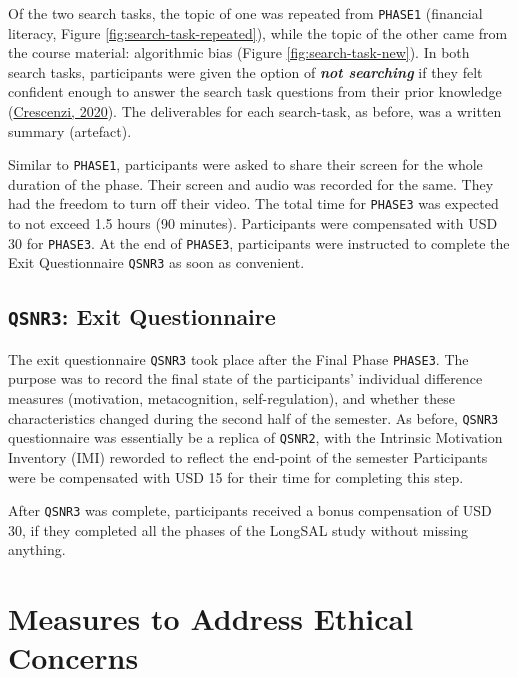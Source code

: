 \documentclass[letterpaper, nobind]{templates/ociamthesis}
\begin{document}
Of the two search tasks, the topic of one was repeated from \texttt{PHASE1} (financial literacy, Figure \ref{fig:search-task-repeated}), while the topic of the other came from the course material: algorithmic bias (Figure \ref{fig:search-task-new}).
In both search tasks, participants were given the option of \textbf{\emph{not searching}} if they felt confident enough to answer the search task questions from their prior knowledge (\protect\hyperlink{ref-crescenzi2020adaptation}{Crescenzi, 2020}).
The deliverables for each search-task, as before, was a written summary (artefact).

Similar to \texttt{PHASE1}, participants were asked to share their screen for the whole duration of the phase.
Their screen and audio was recorded for the same. They had the freedom to turn off their video. The total time for \texttt{PHASE3} was expected to not exceed 1.5 hours (90 minutes).
Participants were compensated with USD 30 for \texttt{PHASE3}.
At the end of \texttt{PHASE3}, participants were instructed to complete the Exit Questionnaire \texttt{QSNR3} as soon as convenient.

\hypertarget{sec-method-qsnr3}{%
\subsection{\texorpdfstring{\texttt{QSNR3}: Exit Questionnaire}{QSNR3: Exit Questionnaire}}\label{sec-method-qsnr3}}

The exit questionnaire \texttt{QSNR3} took place after the Final Phase \texttt{PHASE3}.
The purpose was to record the final state of the participants' individual difference measures (motivation, metacognition, self-regulation), and whether these characteristics changed during the second half of the semester.
As before, \texttt{QSNR3} questionnaire was essentially be a replica of \texttt{QSNR2}, with the Intrinsic Motivation Inventory (IMI) reworded to reflect the end-point of the semester
Participants were be compensated with USD 15 for their time for completing this step.

After \texttt{QSNR3} was complete, participants received a bonus compensation of USD 30, if they completed all the phases of the LongSAL study without missing anything.

\hypertarget{measures-to-address-ethical-concerns}{%
\section{Measures to Address Ethical Concerns}\label{measures-to-address-ethical-concerns}}
\end{document}
